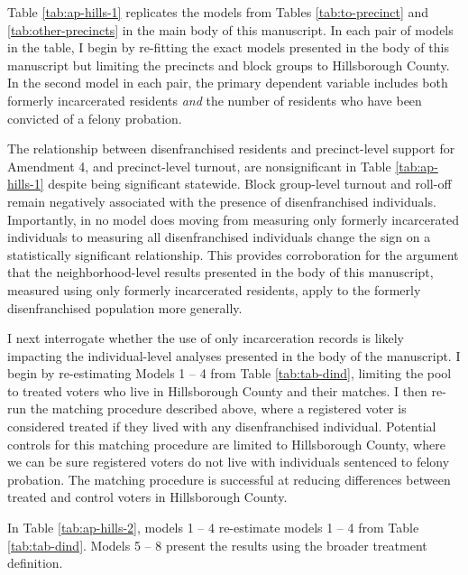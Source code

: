 \documentclass[
  12pt,
]{article}
\begin{document}
Table \ref{tab:ap-hills-1} replicates the models from Tables \ref{tab:to-precinct} and \ref{tab:other-precincts} in the main body of this manuscript. In each pair of models in the table, I begin by re-fitting the exact models presented in the body of this manuscript but limiting the precincts and block groups to Hillsborough County. In the second model in each pair, the primary dependent variable includes both formerly incarcerated residents \emph{and} the number of residents who have been convicted of a felony probation.

\begin{singlespace}


\end{singlespace}

The relationship between disenfranchised residents and precinct-level support for Amendment 4, and precinct-level turnout, are nonsignificant in Table \ref{tab:ap-hills-1} despite being significant statewide. Block group-level turnout and roll-off remain negatively associated with the presence of disenfranchised individuals. Importantly, in no model does moving from measuring only formerly incarcerated individuals to measuring all disenfranchised individuals change the sign on a statistically significant relationship. This provides corroboration for the argument that the neighborhood-level results presented in the body of this manuscript, measured using only formerly incarcerated residents, apply to the formerly disenfranchised population more generally.

I next interrogate whether the use of only incarceration records is likely impacting the individual-level analyses presented in the body of the manuscript. I begin by re-estimating Models 1 -- 4 from Table \ref{tab:tab-dind}, limiting the pool to treated voters who live in Hillsborough County and their matches. I then re-run the matching procedure described above, where a registered voter is considered treated if they lived with any disenfranchised individual. Potential controls for this matching procedure are limited to Hillsborough County, where we can be sure registered voters do not live with individuals sentenced to felony probation. The matching procedure is successful at reducing differences between treated and control voters in Hillsborough County.

In Table \ref{tab:ap-hills-2}, models 1 -- 4 re-estimate models 1 -- 4 from Table \ref{tab:tab-dind}. Models 5 -- 8 present the results using the broader treatment definition.
\end{document}
